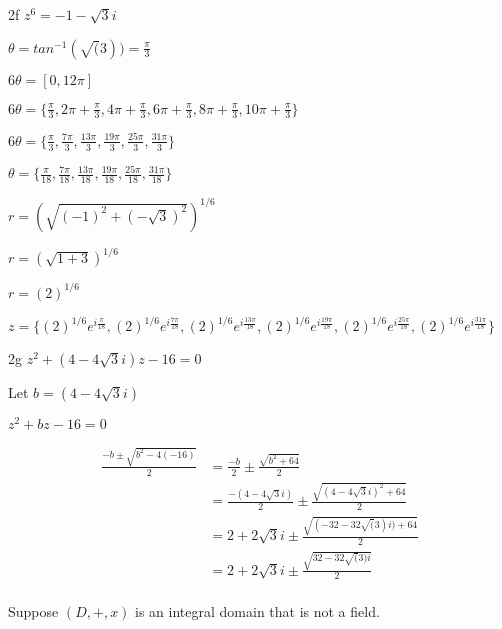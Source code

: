\begin{question}{2f}
$z^6 = -1 - \sqrt{3}i$

$\theta = tan^{-1}(\sqrt(3)) = \frac{\pi}{3}$

$6\theta = [0, 12\pi]$

$6\theta = \{\frac{\pi}{3}, 2\pi+ \frac{\pi}{3}, 4\pi+\frac{\pi}{3}, 6\pi+\frac{\pi}{3}, 8\pi+\frac{\pi}{3}, 10\pi+\frac{\pi}{3}  \}$

$6\theta = \{\frac{\pi}{3}, \frac{7\pi}{3}, \frac{13\pi}{3}, \frac{19\pi}{3}, \frac{25\pi}{3}, \frac{31\pi}{3}  \}$

$\theta = \{\frac{\pi}{18}, \frac{7\pi}{18}, \frac{13\pi}{18}, \frac{19\pi}{18}, \frac{25\pi}{18}, \frac{31\pi}{18}  \}$

$r = (\sqrt{(-1)^2 + (-\sqrt{3})^2})^{1/6}$

$r = (\sqrt{1+3})^{1/6}$

$r = (2)^{1/6}$

$z = \{(2)^{1/6}e^{i\frac{\pi}{18}}, (2)^{1/6}e^{i\frac{7\pi}{18}}, (2)^{1/6}e^{i\frac{13\pi}{18}}, (2)^{1/6}e^{i\frac{19\pi}{18}}, (2)^{1/6}e^{i\frac{25\pi}{18}}, (2)^{1/6}e^{i\frac{31\pi}{18}}  \}$

\end{question}
\begin{question}{2g}
$z^2 + (4-4\sqrt{3}i)z -16 = 0$

Let $b = (4-4\sqrt{3}i)$

$z^2 + bz -16 = 0$

\begin{align*}
\frac{-b\pm \sqrt{b^2-4(-16)}}{2} 
  &= \frac{-b}{2}\pm \frac{\sqrt{b^2+64}}{2} \\
  &= \frac{-(4-4\sqrt{3}i)}{2}\pm \frac{\sqrt{(4-4\sqrt{3}i)^2+64}}{2} \\
  &= 2+2\sqrt{3}i  \pm  \frac{\sqrt{(-32-32\sqrt(3)i)+64}}{2} \\
  &= 2+2\sqrt{3}i  \pm  \frac{\sqrt{32-32\sqrt(3)i}}{2} \\
\end{align*}

\end{question}
\begin{question}{3}
Suppose $(D, +, x)$ is an integral domain that is not a field.
\end{question}
